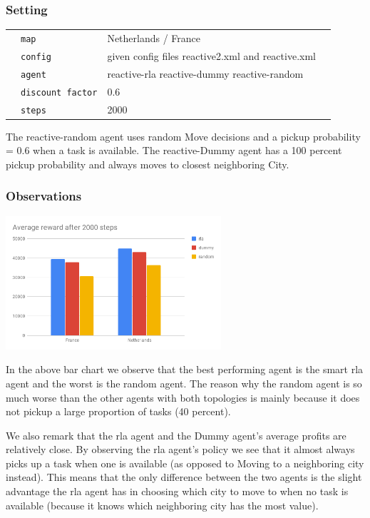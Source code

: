 \documentclass[11pt]{article}
\begin{document}
\subsubsection{Setting}
 \begin{table}[H]
  \begin{tabular}{llll}
   &\texttt{map }  &Netherlands / France\\
   &\texttt{config}  & given config files reactive2.xml and reactive.xml \\
   &\texttt{agent}  &reactive-rla reactive-dummy reactive-random\\
   &\texttt{discount factor}  &0.6\\
   &\texttt{steps}  &2000
  \end{tabular}
 \end{table}
 
 The reactive-random agent uses random Move decisions and a pickup probability = 0.6 when a task is available.
The reactive-Dummy agent has a 100 percent pickup probability and always moves to closest neighboring City.

 
\subsubsection{Observations}
 \includegraphics[width=0.6\textwidth]{agents.png}

In the above bar chart we observe that the best performing agent is the smart rla agent and the worst is the random agent. The reason why the random agent is so much worse than the other agents with both topologies is mainly because it does not pickup a large proportion of tasks (40 percent).

We also remark that the rla agent and the Dummy agent’s average profits are relatively close. By observing the rla agent’s policy we see that it almost always picks up a task when one is available (as opposed to Moving to a neighboring city instead). This means that the only difference between the two agents is the slight advantage the rla agent has in choosing which city to move to when no task is available (because it knows which neighboring city has the most value).
\end{document}

